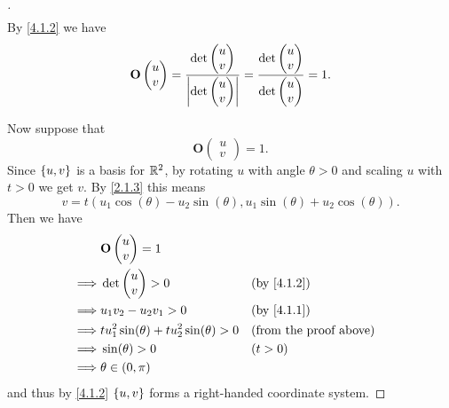 \begin{proof}[]
\begin{align*}
  \end{align*}
  By \cref{4.1.2} we have
  \[
    \mathbf{O}\begin{pmatrix}
      u \\
      v
    \end{pmatrix} = \dfrac{\det\begin{pmatrix}
        u \\
        v
      \end{pmatrix}}{\left\lvert\det\begin{pmatrix}
          u \\
          v
        \end{pmatrix}\right\rvert} = \dfrac{\det\begin{pmatrix}
        u \\
        v
      \end{pmatrix}}{\det\begin{pmatrix}
        u \\
        v
      \end{pmatrix}} = 1.
  \]

  Now suppose that
  \[
    \mathbf{O}\begin{pmatrix}
      u \\
      v
    \end{pmatrix} = 1.
  \]
  Since \(\left\lbrace u, v\right\rbrace\) is a basis for \(\mathbb{R}^2\), by rotating \(u\) with angle \(\theta > 0\) and scaling \(u\) with \(t > 0\) we get \(v\).
  By \cref{2.1.3} this means
  \[
    v = t (u_1 \cos(\theta) - u_2 \sin(\theta), u_1 \sin(\theta) + u_2 \cos(\theta)).
  \]
  Then we have
  \begin{align*}
             & \mathbf{O}\begin{pmatrix}
                           u \\
                           v
                         \end{pmatrix} = 1                                                        \\
    \implies & \det\begin{pmatrix}
                     u \\
                     v
                   \end{pmatrix} > 0                             &  & \by{4.1.2}                  \\
    \implies & u_1 v_2 - u_2 v_1 > 0                           &  & \by{4.1.1}                    \\
    \implies & t u_1^2 \sin(\theta) + t u_2^2 \sin(\theta) > 0 &  & \text{(from the proof above)} \\
    \implies & \sin(\theta) > 0                                &  & (t > 0)                       \\
    \implies & \theta \in (0, \pi)
  \end{align*}
  and thus by \cref{4.1.2} \(\left\lbrace u, v\right\rbrace\) forms a right-handed coordinate system.
\end{proof}
